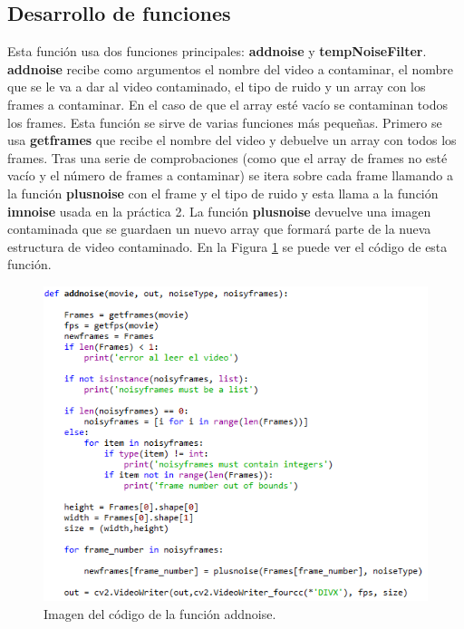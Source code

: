 \documentclass[a4paper,12pt]{report}
\begin{document}
\subsection{Desarrollo de funciones}

Esta función usa dos funciones principales: \textbf{addnoise} y \textbf{tempNoiseFilter}.\\

\textbf{addnoise} recibe como argumentos el nombre del video a contaminar, el nombre que se le va a dar al video contaminado, el tipo de ruido y un array con los frames a contaminar. En el caso de que el array esté vacío se contaminan todos los frames. Esta función se sirve de varias funciones más pequeñas. Primero se usa \textbf{getframes} que recibe el nombre del video y debuelve un array con todos los frames. Tras una serie de comprobaciones (como que el array de frames no esté vacío y el número de frames a contaminar) se itera sobre cada frame llamando a la función \textbf{plusnoise} con el frame y el tipo de ruido y esta llama a la función \textbf{imnoise} usada en la práctica 2. La función \textbf{plusnoise} devuelve una imagen contaminada que se guardaen un nuevo array que formará parte de la nueva estructura de video contaminado. En la Figura \ref{addnoise} se puede ver el código de esta función.\\

\begin{figure}[h]
\centering
\includegraphics[width=1.0\textwidth]{imagenes/addnoise}
\caption{Imagen del código de la función addnoise.}
\label{addnoise} 
\end{figure}
\end{document}
